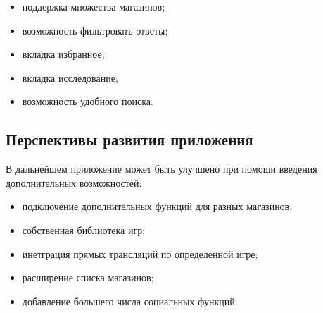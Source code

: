 \begin{itemize}
  \item поддержка множества магазинов;
  \item возможность фильтровать ответы;
  \item вкладка избранное;
  \item вкладка исследование;
  \item возможность удобного поиска.
\end{itemize}
 
\subsection{Перспективы развития приложения}
В дальнейшем приложение может быть улучшено при помощи введения дополнительных возможностей:
\begin{itemize}
  \item подключение дополнительных функций для разных магазинов;
  \item собственная библиотека игр;
  \item инетграция прямых трансляций по определенной игре;
  \item расширение списка магазинов;
  \item добавление большего числа социальных функций.
\end{itemize}
